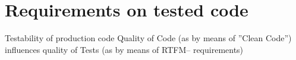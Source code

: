 \documentclass[SoftwareQuality.tex]{subfiles}
\begin{document}
\section{Requirements on tested code}

\begin{frame}{Testability of production code} 
	Quality of Code (as by means of ''Clean Code'') influences quality of Tests (as by means of RTFM-- requirements)
\end{frame}
\end{document}
